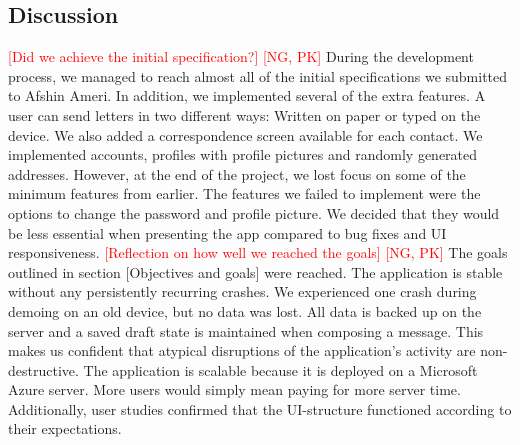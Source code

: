\documentclass[acmlarge, review=false, screen=true]{acmart}
\begin{document}
    \subsection{Discussion}
      \textcolor{red}{[Did we achieve the initial specification?] [NG, PK]} \newline
      During the development process, we managed to reach almost all of the initial specifications we submitted to Afshin Ameri. In addition, we implemented several of the extra features. A user can send letters in two different ways: Written on paper or typed on the device. We also added a correspondence screen available for each contact. We implemented accounts, profiles with profile pictures and randomly generated addresses. However, at the end of the project, we lost focus on some of the minimum features from earlier. The features we failed to implement were the options to change the password and profile picture. We decided that they would be less essential when presenting the app compared to bug fixes and UI responsiveness.
\newline\newline
      \textcolor{red}{[Reflection on how well we reached the goals] [NG, PK]} \newline
      The goals outlined in section [Objectives and goals] were reached. The application is stable without any persistently recurring crashes. We experienced one crash during demoing on an old device, but no data was lost. All data is backed up on the server and a saved draft state is maintained when composing a message. This makes us confident that atypical disruptions of the application’s activity are non-destructive. The application is scalable because it is deployed on a Microsoft Azure server. More users would simply mean paying for more server time. Additionally, user studies confirmed that the UI-structure functioned according to their expectations. 


      




  
\end{document}
